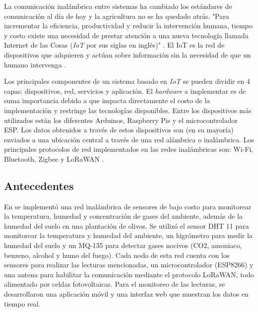 
La comunicación inalámbrica entre sistemas ha cambiado los estándares de comunicación al día de hoy y la agricultura no se ha quedado atrás. "Para incrementar la eficiencia, productividad y reducir la intervención humana, tiempo y costo existe una necesidad de prestar atención a una nueva tecnología llamada Internet de las Cosas (\textit{IoT} por sus siglas en inglés)" \cite{agriculture_automation_review}. El IoT es la red de dispositivos que adquieren y actúan sobre información sin la necesidad de que un humano intervenga \cite{agriculture_automation_review}. 

Los principales componentes de un sistema basado en \textit{IoT} se pueden dividir en 4 capas: dispositivos, red, servicios y aplicación. El \textit{hardware} a implementar es de suma importancia debido a que impacta directamente el costo de la implementación y restringe las tecnologías disponibles. Entre los dispositivos más utilizados están los diferentes Arduinos, Raspberry Pis y el microcontrolador ESP. Los datos obtenidos a través de estos dispositivos son (en su mayoría) enviados a una ubicación central a través de una red alámbrica o inalámbrica. Los principales protocolos de red implementados en las redes inalámbricas son: Wi-Fi, Bluetooth, Zigbee y LoRaWAN \cite{systematicreviewiot}. 

\subsection{Antecedentes}

En \cite{olive_orchard_monitorization} se implementó una red inalámbrica de sensores de bajo costo para monitorear la temperatura, humedad y concentración de gases del ambiente, además de la humedad del suelo en una plantación de olivos. Se utilizó el sensor DHT 11 para monitorear la temperatura y humedad del ambiente, un higrómetro para medir la humedad del suelo y un MQ-135 para detectar gases nocivos (CO2, amoniaco, benzeno, alcohol y humo del fuego). Cada nodo de esta red cuenta con los sensores para realizar las lecturas mencionadas, un microcontrolador (ESP8266) y una antena para habilitar la comunicación mediante el protocolo LoRaWAN, todo alimentado por celdas fotovoltaicas. Para el monitoreo de las lecturas, se desarrollaron una aplicación móvil y una interfaz web que muestran los datos en tiempo real.

